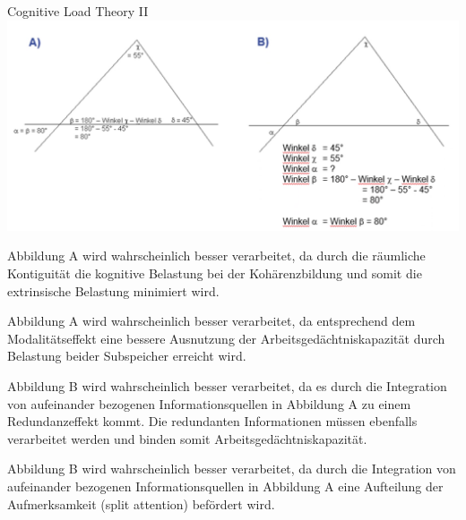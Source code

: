 \begin{multiple-choice}{Cognitive Load Theory II}
    \\
    \includegraphics[width=\fpeval{0.7*\textwidth}pt]{Cognitive Load Theory.png}
    \begin{answers}
        \item[\correct] Abbildung A wird wahrscheinlich besser verarbeitet, da durch die räumliche Kontiguität die kognitive Belastung bei der Kohärenzbildung und somit die extrinsische Belastung minimiert wird.
        \item[\wrong] Abbildung A wird wahrscheinlich besser verarbeitet, da entsprechend dem Modalitätseffekt eine bessere Ausnutzung der Arbeitsgedächtniskapazität durch Belastung beider Subspeicher erreicht wird.
        \item[\wrong] Abbildung B wird wahrscheinlich besser verarbeitet, da es durch die Integration von aufeinander bezogenen Informationsquellen in Abbildung A zu einem Redundanzeffekt kommt. Die redundanten Informationen müssen ebenfalls verarbeitet werden und binden somit Arbeitsgedächtniskapazität.
        \item[\wrong] Abbildung B wird wahrscheinlich besser verarbeitet, da durch die Integration von aufeinander bezogenen Informationsquellen in Abbildung A eine Aufteilung der Aufmerksamkeit (split attention) befördert wird.
    \end{answers}
\end{multiple-choice}

